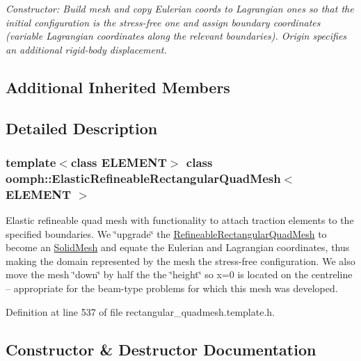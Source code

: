 \begin{DoxyCompactItemize}
\begin{DoxyCompactList}\small\item\em Constructor\+: Build mesh and copy Eulerian coords to Lagrangian ones so that the initial configuration is the stress-\/free one and assign boundary coordinates (variable Lagrangian coordinates along the relevant boundaries). Origin specifies an additional rigid-\/body displacement. \end{DoxyCompactList}\end{DoxyCompactItemize}
\subsection*{Additional Inherited Members}


\subsection{Detailed Description}
\subsubsection*{template$<$class E\+L\+E\+M\+E\+NT$>$\newline
class oomph\+::\+Elastic\+Refineable\+Rectangular\+Quad\+Mesh$<$ E\+L\+E\+M\+E\+N\+T $>$}

Elastic refineable quad mesh with functionality to attach traction elements to the specified boundaries. We \char`\"{}upgrade\char`\"{} the \hyperlink{classoomph_1_1RefineableRectangularQuadMesh}{Refineable\+Rectangular\+Quad\+Mesh} to become an \hyperlink{classoomph_1_1SolidMesh}{Solid\+Mesh} and equate the Eulerian and Lagrangian coordinates, thus making the domain represented by the mesh the stress-\/free configuration. We also move the mesh \char`\"{}down\char`\"{} by half the the \char`\"{}height\char`\"{} so x=0 is located on the centreline -- appropriate for the beam-\/type problems for which this mesh was developed. 

Definition at line 537 of file rectangular\+\_\+quadmesh.\+template.\+h.



\subsection{Constructor \& Destructor Documentation}
\mbox{\label{classoomph_1_1ElasticRefineableRectangularQuadMesh_aa3d9df728974ce172bf942bc4f6c1a2d}} 
